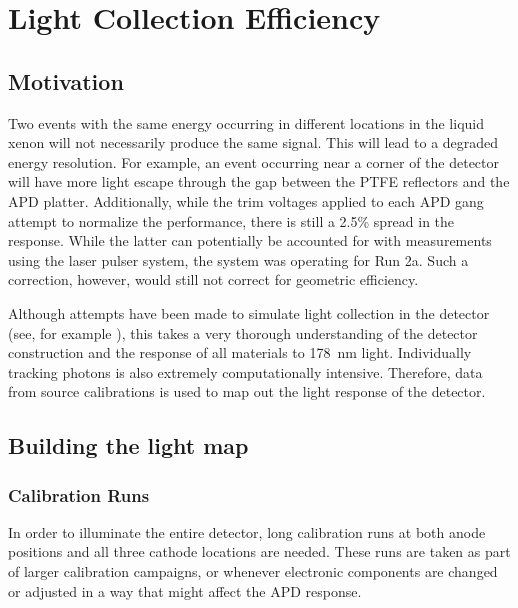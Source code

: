 \documentclass[herrin-thesis.tex]{subfiles}
\begin{document}
\chapter{Light Collection Efficiency}
\label{app:lightmap}

\section{Motivation}
Two events with the same energy occurring in different locations in the liquid xenon will not necessarily produce the same signal. This will lead to a degraded energy resolution. For example, an event occurring near a corner of the detector will have more light escape through the gap between the PTFE reflectors and the APD platter. Additionally, while the trim voltages applied to each APD gang attempt to normalize the performance, there is still a 2.5\% spread in the response. While the latter can potentially be accounted for with measurements using the laser pulser system, the system was operating for Run 2a. Such a correction, however, would still not correct for geometric efficiency.

Although attempts have been made to simulate light collection in the detector (see, for example \cite{Mackay:2011fk}), this takes a very thorough understanding of the detector construction and the response of all materials to \SI{178}{\nm} light. Individually tracking photons is also extremely computationally intensive. Therefore, data from source calibrations is used to map out the light response of the detector.

\section{Building the light map}
\subsection{Calibration Runs}
In order to illuminate the entire detector, long calibration runs at both anode positions and all three cathode locations are needed. These runs are taken as part of larger calibration campaigns, or whenever electronic components are changed or adjusted in a way that might affect the APD response.
\end{document}
